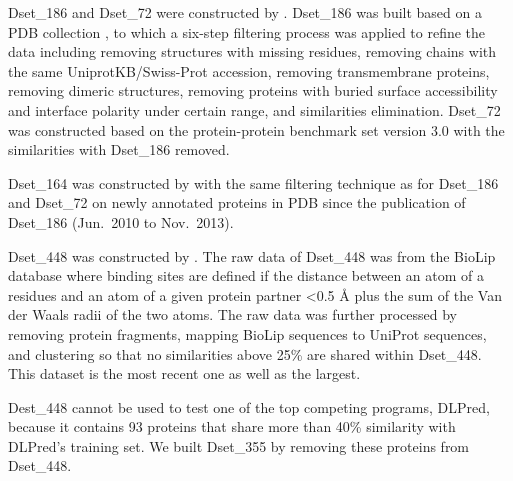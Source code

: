 Dset\_186 and Dset\_72 were constructed by \cite{murakami2010applying}. Dset\_186 was built based on a PDB collection \cite{berman2002protein}, to which a six-step filtering process was applied to refine the data including removing structures with missing residues, removing chains with the same UniprotKB/Swiss-Prot accession, removing transmembrane proteins, removing dimeric structures, removing proteins with buried surface accessibility and interface polarity under certain range, and similarities elimination. Dset\_72 was constructed based on the protein-protein benchmark set version 3.0 \cite{hwang2008protein} with the similarities with Dset\_186 removed.

Dset\_164 was constructed by \cite{dhole2014sequence} with the same filtering technique as for Dset\_186 and Dset\_72 on newly annotated proteins in PDB since the publication of Dset\_186 (Jun.~2010 to Nov.~2013). 

Dset\_448 was constructed by \cite{zhang2019scriber}. The raw data of Dset\_448 was from the BioLip database \cite{yang2012biolip} where binding sites are defined if the distance between an atom of a residues and an atom of a given protein partner <0.5 \AA{} plus the sum of the Van der Waals radii of the two atoms. The raw data was further processed by removing protein fragments, mapping BioLip sequences to UniProt sequences, and clustering so that no similarities above 25\% are shared within Dset\_448. This dataset is the most recent one as well as the largest. 

Dest\_448 cannot be used to test one of the top competing programs, DLPred, because it contains 93 proteins that share more than 40\% similarity with DLPred's training set. We built Dset\_355 by removing these proteins from Dset\_448.


